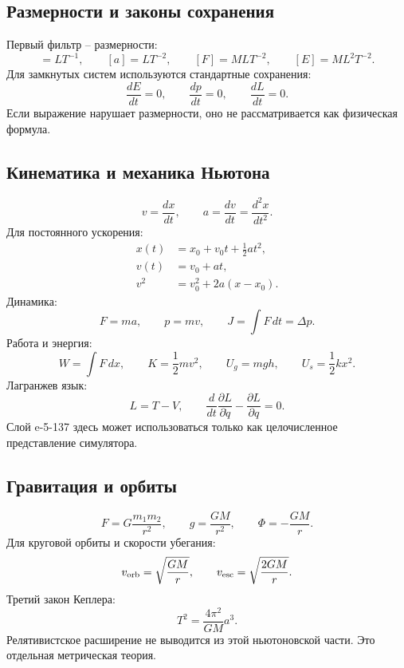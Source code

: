 \documentclass[11pt]{article}
\begin{document}
\subsection{Размерности и законы сохранения}

Первый фильтр -- размерности:
\begin{equation}
    [v]=LT^{-1},\qquad
    [a]=LT^{-2},\qquad
    [F]=MLT^{-2},\qquad
    [E]=ML^2T^{-2}.
\end{equation}
Для замкнутых систем используются стандартные сохранения:
\begin{equation}
    \frac{dE}{dt}=0,\qquad
    \frac{dp}{dt}=0,\qquad
    \frac{dL}{dt}=0.
\end{equation}
Если выражение нарушает размерности, оно не рассматривается как физическая
формула.

\subsection{Кинематика и механика Ньютона}

\begin{equation}
    v=\frac{dx}{dt},\qquad
    a=\frac{dv}{dt}=\frac{d^2x}{dt^2}.
\end{equation}
Для постоянного ускорения:
\begin{align}
    x(t)&=x_0+v_0t+\frac{1}{2}at^2,\\
    v(t)&=v_0+at,\\
    v^2&=v_0^2+2a(x-x_0).
\end{align}
Динамика:
\begin{equation}
    F=ma,\qquad p=mv,\qquad J=\int F\,dt=\Delta p.
\end{equation}
Работа и энергия:
\begin{equation}
    W=\int F\,dx,\qquad
    K=\frac{1}{2}mv^2,\qquad
    U_g=mgh,\qquad
    U_s=\frac{1}{2}kx^2.
\end{equation}
Лагранжев язык:
\begin{equation}
    L=T-V,\qquad
    \frac{d}{dt}\frac{\partial L}{\partial \dot{q}}
    -\frac{\partial L}{\partial q}=0.
\end{equation}
Слой e-5-137 здесь может использоваться только как целочисленное
представление симулятора.

\subsection{Гравитация и орбиты}

\begin{equation}
    F=G\frac{m_1m_2}{r^2},\qquad
    g=\frac{GM}{r^2},\qquad
    \Phi=-\frac{GM}{r}.
\end{equation}
Для круговой орбиты и скорости убегания:
\begin{equation}
    v_{\rm orb}=\sqrt{\frac{GM}{r}},
    \qquad
    v_{\rm esc}=\sqrt{\frac{2GM}{r}}.
\end{equation}
Третий закон Кеплера:
\begin{equation}
    T^2=\frac{4\pi^2}{GM}a^3.
\end{equation}
Релятивистское расширение не выводится из этой ньютоновской части.  Это
отдельная метрическая теория.
\end{document}
